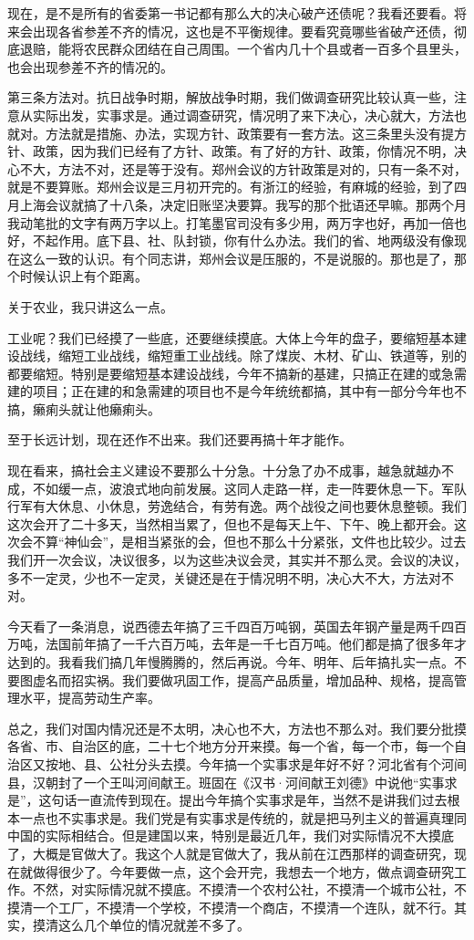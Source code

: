 现在，是不是所有的省委第一书记都有那么大的决心破产还债呢？我看还要看。将来会出现各省参差不齐的情况，这也是不平衡规律。要看究竟哪些省破产还债，彻底退赔，能将农民群众团结在自己周围。一个省内几十个县或者一百多个县里头，也会出现参差不齐的情况的。

第三条方法对。抗日战争时期，解放战争时期，我们做调查研究比较认真一些，注意从实际出发，实事求是。通过调查研究，情况明了来下决心，决心就大，方法也就对。方法就是措施、办法，实现方针、政策要有一套方法。这三条里头没有提方针、政策，因为我们已经有了方针、政策。有了好的方针、政策，你情况不明，决心不大，方法不对，还是等于没有。郑州会议的方针政策是对的，只有一条不对，就是不要算账。郑州会议是三月初开完的。有浙江的经验，有麻城的经验，到了四月上海会议就搞了十八条，决定旧账坚决要算。我写的那个批语还早嘛。那两个月我动笔批的文字有两万字以上。打笔墨官司没有多少用，两万字也好，再加一倍也好，不起作用。底下县、社、队封锁，你有什么办法。我们的省、地两级没有像现在这么一致的认识。有个同志讲，郑州会议是压服的，不是说服的。那也是了，那个时候认识上有个距离。

关于农业，我只讲这么一点。

工业呢？我们已经摸了一些底，还要继续摸底。大体上今年的盘子，要缩短基本建设战线，缩短工业战线，缩短重工业战线。除了煤炭、木材、矿山、铁道等，别的都要缩短。特别是要缩短基本建设战线，今年不搞新的基建，只搞正在建的或急需建的项目；正在建的和急需建的项目也不是今年统统都搞，其中有一部分今年也不搞，癞痢头就让他癞痢头。

至于长远计划，现在还作不出来。我们还要再搞十年才能作。

现在看来，搞社会主义建设不要那么十分急。十分急了办不成事，越急就越办不成，不如缓一点，波浪式地向前发展。这同人走路一样，走一阵要休息一下。军队行军有大休息、小休息，劳逸结合，有劳有逸。两个战役之间也要休息整顿。我们这次会开了二十多天，当然相当累了，但也不是每天上午、下午、晚上都开会。这次会不算“神仙会”，是相当紧张的会，但也不那么十分紧张，文件也比较少。过去我们开一次会议，决议很多，以为这些决议会灵，其实并不那么灵。会议的决议，多不一定灵，少也不一定灵，关键还是在于情况明不明，决心大不大，方法对不对。

今天看了一条消息，说西德去年搞了三千四百万吨钢，英国去年钢产量是两千四百万吨，法国前年搞了一千六百万吨，去年是一千七百万吨。他们都是搞了很多年才达到的。我看我们搞几年慢腾腾的，然后再说。今年、明年、后年搞扎实一点。不要图虚名而招实祸。我们要做巩固工作，提高产品质量，增加品种、规格，提高管理水平，提高劳动生产率。

总之，我们对国内情况还是不太明，决心也不大，方法也不那么对。我们要分批摸各省、市、自治区的底，二十七个地方分开来摸。每一个省，每一个市，每一个自治区又按地、县、公社分头去摸。今年搞一个实事求是年好不好？河北省有个河间县，汉朝封了一个王叫河间献王。班固在《汉书·河间献王刘德》中说他“实事求是”，这句话一直流传到现在。提出今年搞个实事求是年，当然不是讲我们过去根本一点也不实事求是。我们党是有实事求是传统的，就是把马列主义的普遍真理同中国的实际相结合。但是建国以来，特别是最近几年，我们对实际情况不大摸底了，大概是官做大了。我这个人就是官做大了，我从前在江西那样的调查研究，现在就做得很少了。今年要做一点，这个会开完，我想去一个地方，做点调查研究工作。不然，对实际情况就不摸底。不摸清一个农村公社，不摸清一个城市公社，不摸清一个工厂，不摸清一个学校，不摸清一个商店，不摸清一个连队，就不行。其实，摸清这么几个单位的情况就差不多了。

